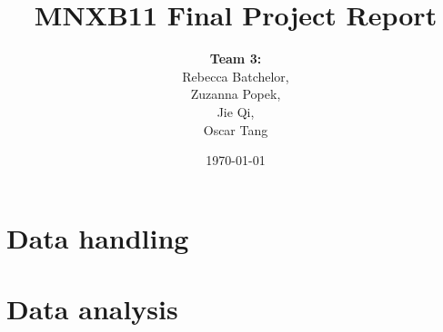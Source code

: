 \documentclass[12pt, a4paper]{article}
\title{MNXB11 Final Project Report}
\author{\textbf{Team 3:}\\
Rebecca Batchelor, \\ 
Zuzanna Popek, \\
Jie Qi, \\
Oscar Tang 
}
\date{\today}
\begin{document}
\maketitle
\thispagestyle{empty}
\clearpage
\tableofcontents
\clearpage
{}


\FloatBarrier
\section{Data handling}


\FloatBarrier
\section{Data analysis}

\FloatBarrier

\FloatBarrier

\FloatBarrier



\printbibliography
\end{document}
